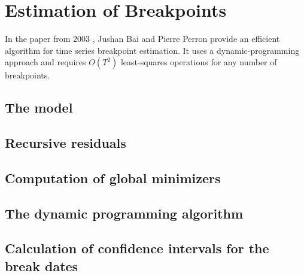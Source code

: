 \documentclass[main.tex]{subfiles}
\begin{document}
\section{Estimation of Breakpoints}
\label{sec:estimation_of_breakpoints}
In the paper from 2003 \cite{bai_perron}, Jushan Bai and Pierre Perron provide an
efficient algorithm for time series breakpoint estimation. It uses a dynamic-programming
approach and requires $O(T^2)$ least-squares operations for any number of breakpoints.


\subsection{The model}
\label{subsec:breakpoints_the_model}


\subsection{Recursive residuals}
\label{subsec:recursive_residuals}


\subsection{Computation of global minimizers}
\label{subsec:breakpoints_the_model}


\subsection{The dynamic programming algorithm}
\label{subsec:the_dynamic_programming_algorithm}

\subsection{Calculation of confidence intervals for the break dates}
\label{subsec:confidence_intervals}

	

\biblio
\end{document}
